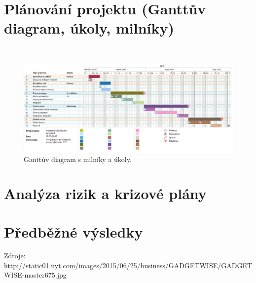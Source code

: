 \documentclass[12pt,a4paper]{article}
\begin{document}

\section*{Plánování projektu (Ganttův diagram, úkoly, milníky)}
\begin{landscape}
~\vfill
\begin{figure}[ht]
	\begin{center}
	\includegraphics[height = 0.6\textheight ]{PTO-Gantt.png}
	\caption{Ganttův diagram s milníky a úkoly.}
	\label{fig:diagram gantt}
	\end{center}
\end{figure}
\vfill
\end{landscape}

\section*{Analýza rizik a krizové plány}

\section*{Předběžné výsledky}

Zdroje:
http://static01.nyt.com/images/2015/06/25/business/GADGETWISE/GADGETWISE-master675.jpg
\end{document}
